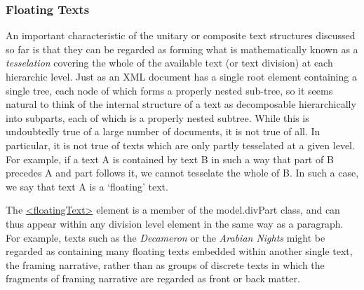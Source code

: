 \subsubsection[{Floating Texts}]{Floating Texts}\label{DSFLT}\par
An important characteristic of the unitary or composite text structures discussed so far is that they can be regarded as forming what is mathematically known as a \textit{tesselation} covering the whole of the available text (or text division) at each hierarchic level. Just as an XML document has a single root element containing a single tree, each node of which forms a properly nested sub-tree, so it seems natural to think of the internal structure of a text as decomposable hierarchically into subparts, each of which is a properly nested subtree. While this is undoubtedly true of a large number of documents, it is not true of all. In particular, it is not true of texts which are only partly tesselated at a given level. For example, if a text A is contained by text B in such a way that part of B precedes A and part follows it, we cannot tesselate the whole of B. In such a case, we say that text A is a ‘floating’ text.\par
The \hyperref[TEI.floatingText]{<floatingText>} element is a member of the \textsf{model.divPart} class, and can thus appear within any division level element in the same way as a paragraph. For example, texts such as the \textit{Decameron} or the \textit{Arabian Nights} might be regarded as containing many floating texts embedded within another single text, the framing narrative, rather than as groups of discrete texts in which the fragments of framing narrative are regarded as front or back matter.\par
